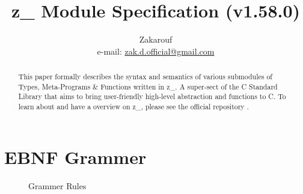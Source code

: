 \documentclass[12pt]{article}
\theoremstyle{break}
\begin{document}
\title{z\_ Module Specification (v1.58.0)}
\data{\today}
\author{Zakarouf \\ e-mail: \href{mailto:zak.d.official@gmail.com}{zak.d.official@gmail.com}}
\maketitle

\begin{abstract}
    This paper formally describes the syntax and semantics of various submodules of Types, Meta-Programs & Functions written in z\_. A super-sect of the C Standard Library that aims to bring user-friendly high-level abstraction and functions to C. To learn about and have a overview on z\_, please see the official repository \cite{z_}.
\end{abstract}

\tableofcontents

\newpage

\section{EBNF Grammer}
\begin{figure}[H]
    \caption{Grammer Rules}


\end{figure}
\end{document}
